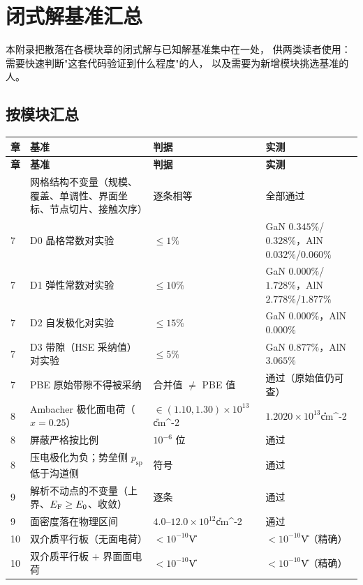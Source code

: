 
\chapter{闭式解基准汇总}
\label{app:benchmarks}

本附录把散落在各模块章的闭式解与已知解基准集中在一处，
供两类读者使用：需要快速判断"这套代码验证到什么程度"的人，
以及需要为新增模块挑选基准的人。

\section{按模块汇总}

{\small
\begin{longtable}{@{}p{} p{} p{} p{}@{}}
\toprule
\textbf{章} & \textbf{基准} & \textbf{判据} & \textbf{实测}\\
\midrule
\endfirsthead
\toprule
\textbf{章} & \textbf{基准} & \textbf{判据} & \textbf{实测}\\
\midrule
\endhead
\bottomrule
\endfoot
6 & 网格结构不变量（规模、覆盖、单调性、界面坐标、节点切片、接触次序） &
  逐条相等 & 全部通过\\
7 & D0 晶格常数对实验 & $\le1\%$ & GaN $0.345\%$/$0.328\%$，AlN $0.032\%$/$0.060\%$\\
7 & D1 弹性常数对实验 & $\le10\%$ & GaN $0.000\%$/$1.728\%$，AlN $2.778\%$/$1.877\%$\\
7 & D2 自发极化对实验 & $\le15\%$ & GaN $0.000\%$，AlN $0.000\%$\\
7 & D3 带隙（HSE 采纳值）对实验 & $\le5\%$ & GaN $0.877\%$，AlN $3.065\%$\\
7 & PBE 原始带隙不得被采纳 & 合并值 $\neq$ PBE 值 & 通过（原始值仍可查）\\
8 & Ambacher 极化面电荷（$x=0.25$） & $\in(1.10,1.30)\times10^{13}$\U{cm^{-2}} &
  $1.2020\times10^{13}$\U{cm^{-2}}\\
8 & 屏蔽严格按比例 & $10^{-6}$ 位 & 通过\\
8 & 压电极化为负；势垒侧 $p_{\text{sp}}$ 低于沟道侧 & 符号 & 通过\\
9 & 解析不动点的不变量（上界、$E_{\mathrm{F}}\ge E_0$、收敛） & 逐条 & 通过\\
9 & 面密度落在物理区间 & $4.0$--$12.0\times10^{12}$\U{cm^{-2}} & 通过\\
10 & 双介质平行板（无面电荷） & $<10^{-10}$\U{V} & $<10^{-10}$\U{V}（精确）\\
10 & 双介质平行板 $+$ 界面面电荷 & $<10^{-10}$\U{V} & $<10^{-10}$\U{V}（精确）\\

\end{longtable}}

